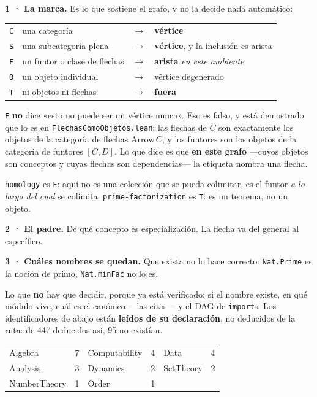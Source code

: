 \documentclass[10pt,a4paper]{article}
\begin{document}
\begin{marca}
\textbf{1 · La marca.} Es lo que sostiene el grafo, y no la decide nada automático:\par\smallskip
\begin{tabular}{@{}llll@{}}\toprule
\texttt{C} & una categoría & $\to$ & \textbf{vértice}\\
\texttt{S} & una subcategoría plena & $\to$ & \textbf{vértice}, y la inclusión es arista\\
\texttt{F} & un funtor o clase de flechas & $\to$ & \textbf{arista} \emph{en este ambiente}\\
\texttt{O} & un objeto individual & $\to$ & vértice degenerado\\
\texttt{T} & ni objetos ni flechas & $\to$ & \textbf{fuera}\\
\bottomrule\end{tabular}\par\smallskip
\begin{sloppypar}
\texttt{F} \textbf{no} dice «esto no puede ser un vértice nunca». Eso es falso, y está demostrado que lo es en \texttt{FlechasComoObjetos.lean}: las flechas de $C$ son exactamente los objetos de la categoría de flechas $\mathrm{Arrow}\,C$, y los funtores son los objetos de la categoría de funtores $[C,D]$. Lo que dice es que \textbf{en este grafo} —cuyos objetos son conceptos y cuyas flechas son dependencias— la etiqueta nombra una flecha.\end{sloppypar}\smallskip
\texttt{homology} es \texttt{F}: aquí no es una colección que se pueda colimitar, es el funtor \emph{a lo largo del cual} se colimita. \texttt{prime-factorization} es \texttt{T}: es un teorema, no un objeto.\par\medskip
\textbf{2 · El padre.} De qué concepto es especialización. La flecha va del general al específico.\par\medskip
\textbf{3 · Cuáles nombres se quedan.} Que exista no lo hace correcto: \texttt{Nat.Prime} es la noción de primo, \texttt{Nat.minFac} no lo es.
\end{marca}

\noindent Lo que \textbf{no} hay que decidir, porque ya está verificado: si el
nombre existe, en qué módulo vive, cuál es el canónico —las citas— y el DAG de
\texttt{import}s. Los identificadores de abajo están \textbf{leídos de su
declaración}, no deducidos de la ruta: de 447 deducidos así, 95 no existían.
\par\medskip

\begin{center}\small\begin{tabular}{@{}lr@{\quad}lr@{\quad}lr@{}}\toprule
Algebra & 7 & Computability & 4 & Data & 4\\
Analysis & 3 & Dynamics & 2 & SetTheory & 2\\
NumberTheory & 1 & Order & 1\\
\bottomrule\end{tabular}\end{center}
\end{document}
